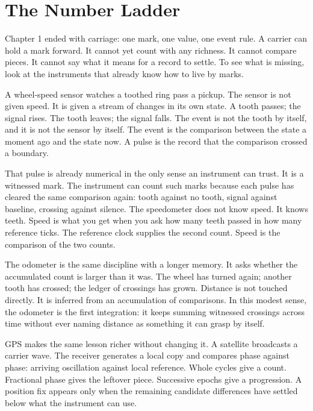 \chapter{The Number Ladder}
\label{chap:number-ladder}


Chapter 1 ended with carriage: one mark, one value, one event rule. A carrier
can hold a mark forward. It cannot yet count with any richness. It cannot
compare pieces. It cannot say what it means for a record to settle. To see what
is missing, look at the instruments that already know how to live by marks.

A wheel-speed sensor watches a toothed ring pass a pickup. The sensor is not
given speed. It is given a stream of changes in its own state. A tooth passes;
the signal rises. The tooth leaves; the signal falls. The event is not the
tooth by itself, and it is not the sensor by itself. The event is the
comparison between the state a moment ago and the state now. A pulse is the
record that the comparison crossed a boundary.

That pulse is already numerical in the only sense an instrument can trust. It
is a witnessed mark. The instrument can count such marks because each pulse
has cleared the same comparison again: tooth against no tooth, signal against
baseline, crossing against silence. The speedometer does not know speed. It
knows teeth. Speed is what you get when you ask how many teeth passed in how
many reference ticks. The reference clock supplies the second count. Speed is
the comparison of the two counts.

The odometer is the same discipline with a longer memory. It asks whether the
accumulated count is larger than it was. The wheel has turned again; another
tooth has crossed; the ledger of crossings has grown. Distance is not touched
directly. It is inferred from an accumulation of comparisons. In this modest
sense, the odometer is the first integration: it keeps summing witnessed
crossings across time without ever naming distance as something it can grasp
by itself.

GPS makes the same lesson richer without changing it. A satellite broadcasts a
carrier wave. The receiver generates a local copy and compares phase against
phase: arriving oscillation against local reference. Whole cycles give a count.
Fractional phase gives the leftover piece. Successive epochs give a progression.
A position fix appears only when the remaining candidate differences have
settled below what the instrument can use.

